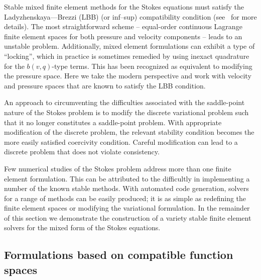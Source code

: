 Stable mixed finite element methods for the Stokes equations must satisfy
the Ladyzhenskaya--\babuska--Brezzi (LBB) (or inf--sup) compatibility
condition (see~\citet{BrezziFortin1991} for more details).  The most
straightforward scheme -- equal-order continuous Lagrange finite element
spaces for both pressure and velocity components -- leads to an unstable
problem.  Additionally, mixed element formulations can exhibit a type of
``locking'', which in practice is sometimes remedied by using inexact
quadrature for the $b(v, q)$-type terms.  This has been recognized as
equivalent to modifying the pressure space.  Here we take the modern
perspective and work with velocity and pressure spaces that are known
to satisfy the LBB condition.

An approach to circumventing the difficulties associated with the
saddle-point nature of the Stokes problem is to modify the discrete
variational problem such that it no longer constitutes a saddle-point
problem. With appropriate modification of the discrete problem, the
relevant stability condition becomes the more easily satisfied coercivity
condition. Careful modification can lead to a discrete problem that does
not violate consistency.

Few numerical studies of the Stokes problem address more than one
finite element formulation. This can be attributed to the difficultly
in implementing a number of the known stable methods. With automated
code generation, solvers for a range of methods can be easily produced;
it is as simple as redefining the finite element spaces or modifying the
variational formulation.  In the remainder of this section we demonstrate
the construction of a variety stable finite element solvers for the
mixed form of the Stokes equations.

\subsection{Formulations based on compatible function spaces}

